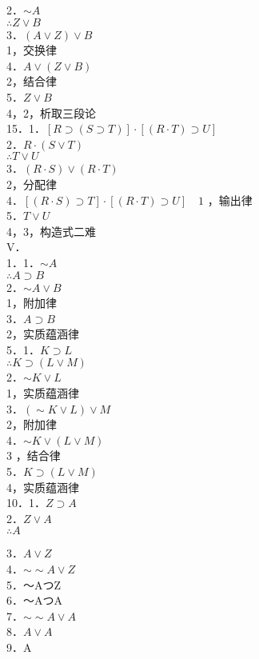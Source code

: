 2．$\sim A$\\
$\therefore Z \vee B$\\
3．$(A \vee Z) \vee B$\\
1，交换律\\
4．$A \vee(Z \vee B)$\\
2，结合律\\
5．$Z \vee B$\\
4，2，析取三段论\\
15．1．$[R \supset(S \supset T)] \cdot[(R \cdot T) \supset U]$\\
2．$R \cdot(S \vee T)$\\
$\therefore T \vee U$\\
3．$(R \cdot S) \vee(R \cdot T)$\\
2，分配律\\
4．$[(R \cdot S) \supset T] \cdot[(R \cdot T) \supset U] \quad 1$ ，输出律\\
5．$T \vee U$\\
4，3，构造式二难\\
V．\\
1．1．$\sim A$\\
$\therefore A \supset B$\\
2．$\sim A \vee B$\\
1，附加律\\
3．$A \supset B$\\
2，实质蕴涵律\\
5．1．$K \supset L$\\
$\therefore K \supset(L \vee M)$\\
2．$\sim K \vee L$\\
1，实质蕴涵律\\
3．$(\sim K \vee L) \vee M$\\
2，附加律\\
4．$\sim K \vee(L \vee M)$\\
3 ，结合律\\
5．$K \supset(L \vee M)$\\
4，实质蕴涵律\\
10．1．$Z \supset A$\\
2．$Z \vee A$\\
$\therefore A$

3．$A \vee Z$\\
4．$\sim \sim A \vee Z$\\
5．～AつZ\\
6．～AつA\\
7．$\sim \sim A \vee A$\\
8．$A \vee A$\\
9．A


